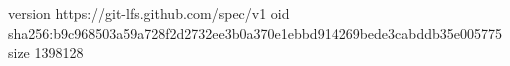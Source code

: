 version https://git-lfs.github.com/spec/v1
oid sha256:b9c968503a59a728f2d2732ee3b0a370e1ebbd914269bede3cabddb35e005775
size 1398128

